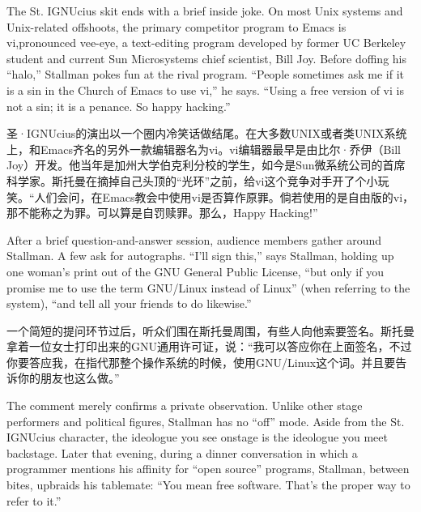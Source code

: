 \ifdefined\eng
The St. IGNUcius skit ends with a brief inside joke. On most Unix systems and Unix-related offshoots, the primary competitor program to Emacs is vi,\ifdefined\vtwo pronounced vee-eye, \fi a text-editing program developed by former UC Berkeley student and current Sun Microsystems chief scientist, Bill Joy. Before doffing his ``halo,'' Stallman pokes fun at the rival program. ``People sometimes ask me if it is a sin in the Church of Emacs to use vi,'' he says. ``Using a free version of vi is not a sin; it is a penance. So happy hacking.''\ifdefined\vtwo{}\fi
\fi

\ifdefined\chs
圣·IGNUcius的演出以一个圈内冷笑话做结尾。在大多数UNIX或者类UNIX系统上，和Emacs齐名的另外一款编辑器名为vi。vi编辑器最早是由比尔·乔伊（Bill Joy）开发。他当年是加州大学伯克利分校的学生，如今是Sun微系统公司的首席科学家。斯托曼在摘掉自己头顶的``光环''之前，给vi这个竞争对手开了个小玩笑。``人们会问，在Emacs教会中使用vi是否算作原罪。倘若使用的是自由版的vi，那不能称之为罪。可以算是自罚赎罪。那么，Happy Hacking!''\ifdefined\vtwo{}\fi
\fi

\ifdefined\eng
After a brief question-and-answer session, audience members gather around Stallman. A few ask for autographs. ``I'll sign this,'' says Stallman, holding up one woman's print out of the GNU General Public License, ``but only if you promise me to use the term GNU/Linux instead of Linux\ifdefined\vtwo '' (when referring to the system), ``\fi and tell all your friends to do likewise.''
\fi

\ifdefined\chs
一个简短的提问环节过后，听众们围在斯托曼周围，有些人向他索要签名。斯托曼拿着一位女士打印出来的GNU通用许可证，说：``我可以答应你在上面签名，不过你要答应我，在指代那整个操作系统的时候，使用GNU/Linux这个词。并且要告诉你的朋友也这么做。''
\fi

\ifdefined\eng
The comment merely confirms a private observation. Unlike other stage performers and political figures, Stallman has no ``off'' mode. Aside from the St. IGNUcius character, the ideologue you see onstage is the ideologue you meet backstage. Later that evening, during a dinner conversation in which a programmer mentions his affinity for ``open source'' programs, Stallman, between bites, upbraids his tablemate: ``You mean free software. That's the proper way to refer to it.''
\fi


